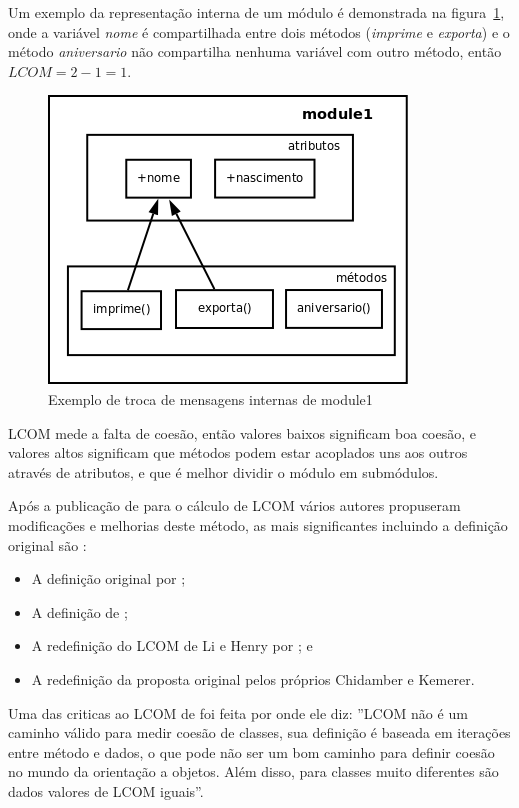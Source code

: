 Um exemplo da representação interna de um módulo é demonstrada na
figura~\ref{fig:exemplo-lcom}, onde a variável {\it nome} é compartilhada entre
dois métodos ({\it imprime} e {\it exporta}) e o método {\it aniversario} não
compartilha nenhuma variável com outro método, então $LCOM = 2 - 1 = 1$.

\begin{figure}[h]
\center
\includegraphics[scale=0.4]{imagens/exemplo-lcom}
\caption{Exemplo de troca de mensagens internas de module1}
\label{fig:exemplo-lcom}
\end{figure}

LCOM mede a falta de coesão, então valores baixos significam boa coesão, e
valores altos significam que métodos podem estar acoplados uns aos outros
através de atributos, e que é melhor dividir o módulo em
submódulos\cite{observationsOnLCOM}.

Após a publicação de  para o cálculo de LCOM
vários autores propuseram modificações e melhorias deste método, as mais
significantes incluindo a definição original são
\cite{principalComponentAnalysisOfLCOM}:

\begin{itemize}
\item A definição original por ;
\item A definição de ;
\item A redefinição do LCOM de Li e Henry por ; e
\item A redefinição da proposta original pelos próprios Chidamber e Kemerer.
\end{itemize}

Uma das criticas ao LCOM de  foi feita por
 onde ele diz: ''LCOM não é um caminho válido
para medir coesão de classes, sua definição é baseada em iterações entre método
e dados, o que pode não ser um bom caminho para definir coesão no mundo da
orientação a objetos. Além disso, para classes muito diferentes são dados
valores de LCOM iguais''.

